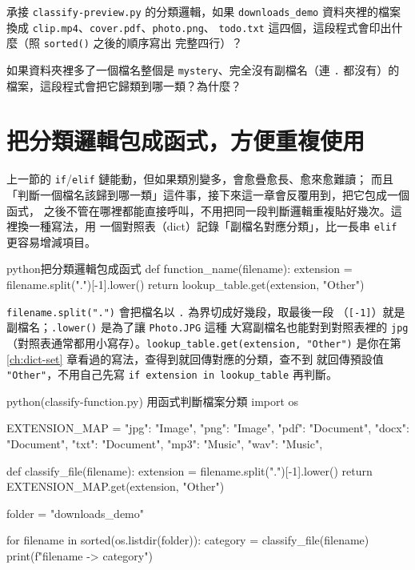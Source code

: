 
\begin{drills}[label=drills:list-preview]
\item 承接 \texttt{classify-preview.py} 的分類邏輯，如果 \texttt{downloads\_demo}
資料夾裡的檔案換成 \texttt{clip.mp4}、\texttt{cover.pdf}、\texttt{photo.png}、
\texttt{todo.txt} 這四個，這段程式會印出什麼（照 \texttt{sorted()} 之後的順序寫出
完整四行）？
\item 如果資料夾裡多了一個檔名整個是 \texttt{mystery}、完全沒有副檔名（連 \texttt{.}
都沒有）的檔案，這段程式會把它歸類到哪一類？為什麼？
\end{drills}

\section{把分類邏輯包成函式，方便重複使用}
\label{sec:classify-function}

上一節的 \texttt{if}/\texttt{elif} 鏈能動，但如果類別變多，會愈疊愈長、愈來愈難讀；
而且「判斷一個檔名該歸到哪一類」這件事，接下來這一章會反覆用到，把它包成一個函式，
之後不管在哪裡都能直接呼叫，不用把同一段判斷邏輯重複貼好幾次。這裡換一種寫法，用
一個對照表（dict）記錄「副檔名對應分類」，比一長串 \texttt{elif} 更容易增減項目。

\begin{code}{python}{把分類邏輯包成函式}
def function_name(filename):
    extension = filename.split(".")[-1].lower()
    return lookup_table.get(extension, "Other")
\end{code}

\texttt{filename.split(".")} 會把檔名以 \texttt{.} 為界切成好幾段，取最後一段
（\texttt{[-1]}）就是副檔名；\texttt{.lower()} 是為了讓 \texttt{Photo.JPG} 這種
大寫副檔名也能對到對照表裡的 \texttt{jpg}（對照表通常都用小寫存）。\texttt{lookup\_table.get(extension, "Other")} 是你在第 \ref{ch:dict-set} 章看過的寫法，查得到就回傳對應的分類，查不到
就回傳預設值 \texttt{"Other"}，不用自己先寫 \texttt{if extension in lookup\_table} 再判斷。

\begin{example}{python}{(classify-function.py) 用函式判斷檔案分類}
import os

EXTENSION_MAP = {
    "jpg": "Image", "png": "Image",
    "pdf": "Document", "docx": "Document", "txt": "Document",
    "mp3": "Music", "wav": "Music",
}


def classify_file(filename):
    extension = filename.split(".")[-1].lower()
    return EXTENSION_MAP.get(extension, "Other")


folder = "downloads_demo"

for filename in sorted(os.listdir(folder)):
    category = classify_file(filename)
    print(f"{filename} -> {category}")
\end{example}

